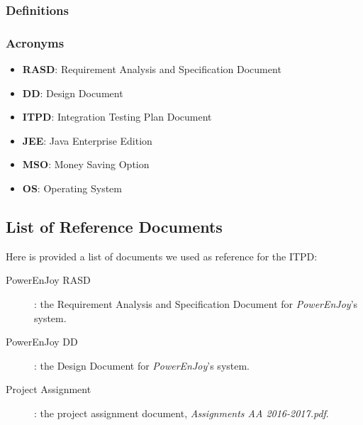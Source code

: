 	\subsubsection{Definitions}
	\subsubsection{Acronyms}
		\begin{itemize}
			\item \textbf{RASD}: Requirement Analysis and Specification Document
			\item \textbf{DD}: Design Document
			\item \textbf{ITPD}: Integration Testing Plan Document
			\item \textbf{JEE}: Java Enterprise Edition
			\item \textbf{MSO}: Money Saving Option
			\item \textbf{OS}: Operating System
		\end{itemize}			
	
	

\subsection{List of Reference Documents}
	Here is provided a list of documents we used as reference for the ITPD:
	
	\begin{description}
		\item[PowerEnJoy RASD]: the Requirement Analysis and Specification Document for \textit{PowerEnJoy}'s system.
		\item[PowerEnJoy DD]: the Design Document for \textit{PowerEnJoy}'s system.
		\item[Project Assignment]: the project assignment document, \textit{Assignments AA 2016-2017.pdf}.
	\end{description}

